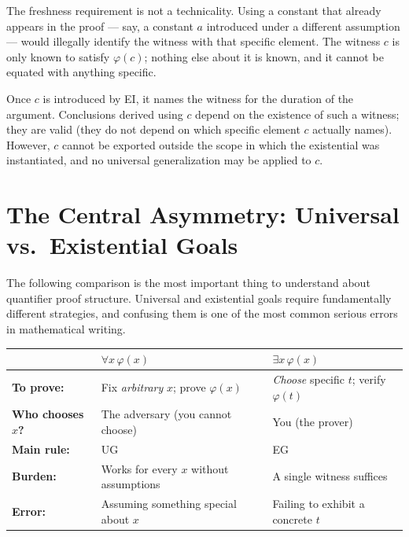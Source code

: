 \begin{exposition}
The freshness requirement is not a technicality. Using a constant that already
appears in the proof --- say, a constant $a$ introduced under a different
assumption --- would illegally identify the witness with that specific element.
The witness $c$ is only known to satisfy $\varphi(c)$; nothing else about it
is known, and it cannot be equated with anything specific.
\end{exposition}

\begin{remark*}
Once $c$ is introduced by EI, it names the witness for the duration of the
argument. Conclusions derived using $c$ depend on the existence of such a
witness; they are valid (they do not depend on which specific element $c$
actually names). However, $c$ cannot be exported outside the scope in which
the existential was instantiated, and no universal generalization may be
applied to $c$.
\end{remark*}


\section*{The Central Asymmetry: Universal vs.\ Existential Goals}

\begin{exposition}
The following comparison is the most important thing to understand about
quantifier proof structure. Universal and existential goals require fundamentally
different strategies, and confusing them is one of the most common serious errors
in mathematical writing.
\end{exposition}

\begin{tcolorbox}[colback=gray!6, colframe=gray!40, arc=2pt,
  left=6pt, right=6pt, top=4pt, bottom=4pt,
  title={\small\textbf{Universal vs.\ Existential Goals: The Fundamental Difference}},
  fonttitle=\small\bfseries]
\small
\begin{tabular}{l l l}
\toprule
 & \textbf{$\forall x\,\varphi(x)$} & \textbf{$\exists x\,\varphi(x)$} \\
\midrule
\textbf{To prove:} & Fix \emph{arbitrary} $x$; prove $\varphi(x)$ & \emph{Choose} specific $t$; verify $\varphi(t)$ \\
\textbf{Who chooses $x$?} & The adversary (you cannot choose) & You (the prover) \\
\textbf{Main rule:} & UG & EG \\
\textbf{Burden:} & Works for every $x$ without assumptions & A single witness suffices \\
\textbf{Error:} & Assuming something special about $x$ & Failing to exhibit a concrete $t$ \\
\bottomrule
\end{tabular}
\end{tcolorbox}

